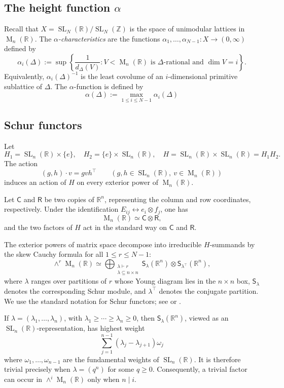 \documentclass[reqno,11pt]{amsart}
\numberwithin{equation}{section}
\theoremstyle{definition}
\theoremstyle{remark}
\newcommand{\op}{\operatorname}
\newcommand{\br}{\mathbb R}
\newcommand{\M}{\op{M}}
\newcommand{\SL}{\op{SL}}
\newcommand{\z}{\mathbb Z}
\begin{document}
\subsection{The height function \texorpdfstring{$\alpha$}{alpha}}
Recall that $X=\SL_N(\br)/\SL_N(\z)$ is the space of unimodular lattices in $\M_n(\br)$.  The
\emph{$\alpha$-characteristics} are the functions
$\alpha_1,\ldots,\alpha_{N-1}:X\to(0,\infty)$ defined by
$$
\alpha_i(\Delta)
:=
\sup\left\{
\frac{1}{d_\Delta(V)}:
V<\M_n(\mathbb R)\text{ is $\Delta$-rational and }\dim V=i
\right\}.
$$
Equivalently, $\alpha_i(\Delta)^{-1}$ is the least covolume of an
$i$-dimensional primitive sublattice of $\Delta$. The $\alpha$-function is defined by
$$
\alpha(\Delta):=\max_{1\le i\le N-1}\alpha_i(\Delta)
$$

\subsection{Schur functors}\label{subsection:SchurFunctors}

Let
$$
H_1=\SL_n(\mathbb R)\times\{e\},
\quad
H_2=\{e\}\times\SL_n(\mathbb R),
\quad
H=\SL_n(\mathbb R)\times \SL_n(\mathbb R)=H_1H_2.
$$
The action 
$$
(g,h)\cdot v=gvh^{\intercal}
\qquad
(g,h\in\SL_n(\mathbb R),\ v\in\M_n(\mathbb R))
$$
induces an action of $H$ on every exterior power of
$\M_n(\mathbb R)$.

Let $\mathsf C$ and $\mathsf R$ be two copies of $\mathbb R^n$,
representing the column and row coordinates, respectively. Under the
identification $E_{ij}\leftrightarrow e_i\otimes f_j$, one has
$$
\M_n(\mathbb R)\simeq \mathsf C\otimes\mathsf R,
$$
and the two factors of $H$ act in the standard way on $\mathsf C$ and
$\mathsf R$. 

The exterior powers of matrix space decompose into irreducible $H$-summands
by the skew Cauchy formula for all $1\le r\le N-1$:
$$
\wedge^r\M_n(\mathbb R)
\simeq
\bigoplus_{\substack{\lambda\vdash r\\ \lambda\subseteq n\times n}}
{\mathsf S}_\lambda(\mathbb R^n)\otimes
{\mathsf S}_{\lambda^{\intercal}}(\mathbb R^n),
$$
where $\lambda$ ranges over
partitions of $r$ whose Young diagram lies in the $n\times n$ box,
${\mathsf S}_\lambda$ denotes the corresponding Schur module, and
$\lambda^{\intercal}$ denotes the conjugate partition. We use the standard
notation for Schur functors; see \cite[Section~4.2]{FultonHarris} or
\cite[Chapter~I]{FultonYT}.

If $\lambda=(\lambda_1,\ldots,\lambda_n)$, with
$\lambda_1\ge\cdots\ge\lambda_n\ge0$, then 
${\mathsf S}_\lambda(\mathbb R^n)$, viewed as an $\SL_n(\mathbb R)$-representation, has highest weight
$$
\sum_{j=1}^{n-1}(\lambda_j-\lambda_{j+1})\omega_j
$$ where $\omega_1,\ldots, \omega_{n-1}$ are the fundamental weights of $\SL_n(\br)$.
It is therefore trivial precisely when $\lambda=(q^n)$ for some
$q\ge0$. Consequently, a trivial factor can occur in
$\wedge^i\M_n(\mathbb R)$ only when $n\mid  i$.
\end{document}
